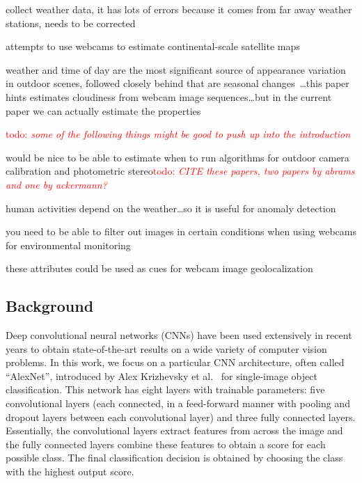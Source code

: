 \documentclass{article}
\newcommand{\todo}[1]{\textcolor{red}{todo: {\em #1}}}
\begin{document}
collect weather data, it has lots of errors because it comes from far
away weather stations, needs to be corrected~\cite{islam13webcamweather}

attempts to use webcams to estimate continental-scale satellite
maps~\cite{murdock13clouds}

weather and time of day are the most significant source of appearance
variation in outdoor scenes, followed closely behind that are seasonal
changes~\cite{jacobs07amos}\dots this paper hints estimates 
cloudiness from webcam image sequences\dots but in
the current paper we can actually estimate the properties

\todo{some of the following things might be good to push up into the
introduction}

would be nice to be able to estimate when to run algorithms for
outdoor camera
calibration\cite{jacobs13cloudcalibration,workman2014rainbow} and
photometric stereo\todo{CITE these papers, two papers by abrams and
one by ackermann?}

human activities depend on the weather\dots so it is useful for
anomaly detection~\cite{abrams12lost}

you need to be able to filter out images in certain conditions when
using webcams for environmental monitoring~\cite{jacobs09webcamgis}

these attributes could be used as cues for webcam image
geolocalization~\cite{jacobs07geolocate}


\subsection{Background}

Deep convolutional neural networks (CNNs) have been used extensively
in recent years to obtain state-of-the-art results on a wide variety
of computer vision problems.  In this work, we focus on a particular
CNN architecture, often called ``AlexNet'', introduced by Alex
Krizhevsky et al.~\cite{caffenetnips12} for single-image object
classification. This network has eight layers with trainable
parameters: five convolutional layers (each connected, in a
feed-forward manner with pooling and dropout layers between each
convolutional layer) and three fully connected layers. Essentially,
the convolutional layers extract features from across the image and
the fully connected layers combine these features to obtain a score
for each possible class. The final classification decision is obtained
by choosing the class with the highest output score.
\end{document}
